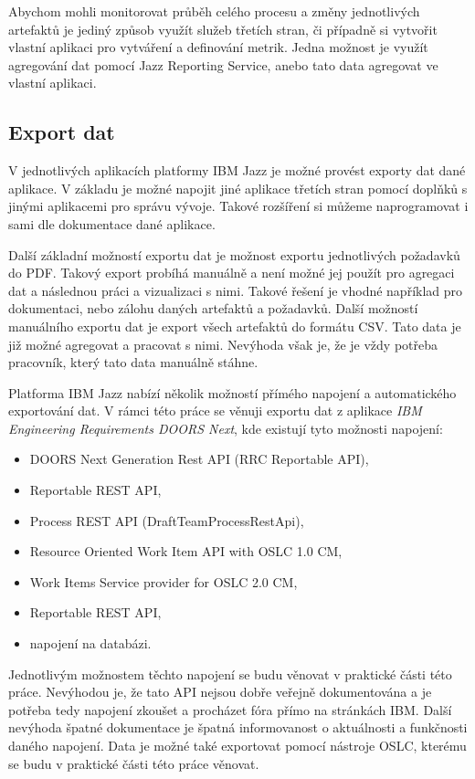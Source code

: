 \documentclass[czech,master]{diploma}
\begin{document}
Abychom mohli monitorovat průběh celého procesu a změny jednotlivých artefaktů je jediný způsob využít služeb třetích stran, či případně si vytvořit vlastní aplikaci pro vytváření a definování metrik. Jedna možnost je využít agregování dat pomocí Jazz Reporting Service, anebo tato data agregovat ve vlastní aplikaci.

\subsection{Export dat}
V jednotlivých aplikacích platformy IBM Jazz je možné provést exporty dat dané aplikace. V základu je možné napojit jiné aplikace třetích stran pomocí doplňků s jinými aplikacemi pro správu vývoje. Takové rozšíření si můžeme naprogramovat i sami dle dokumentace dané aplikace.

Další základní možností exportu dat je možnost exportu jednotlivých požadavků do PDF. Takový export probíhá manuálně a není možné jej použít pro agregaci dat a následnou práci a vizualizaci s nimi. Takové řešení je vhodné například pro dokumentaci, nebo zálohu daných artefaktů a požadavků. Další možností manuálního exportu dat je export všech artefaktů do formátu CSV. Tato data je již možné agregovat a pracovat s nimi. Nevýhoda však je, že je vždy potřeba pracovník, který tato data manuálně stáhne.

Platforma IBM Jazz nabízí několik možností přímého napojení a automatického exportování dat. V rámci této práce se věnuji exportu dat z aplikace \textit{IBM Engineering Requirements DOORS Next}, kde existují tyto možnosti napojení:

\begin{itemize}
\item DOORS Next Generation Rest API (RRC Reportable API),
\item Reportable REST API,
\item Process REST API (DraftTeamProcessRestApi),
\item Resource Oriented Work Item API with OSLC 1.0 CM,
\item Work Items Service provider for OSLC 2.0 CM,
\item Reportable REST API,
\item napojení na databázi.
\end{itemize}

Jednotlivým možnostem těchto napojení se budu věnovat v praktické části této práce. Nevýhodou je, že tato API nejsou dobře veřejně dokumentována a je potřeba tedy napojení zkoušet a procházet fóra přímo na stránkách IBM. Další nevýhoda špatné dokumentace je špatná informovanost o aktuálnosti a funkčnosti daného napojení. Data je možné také exportovat pomocí nástroje OSLC, kterému se budu v praktické části této práce věnovat.
\end{document}
